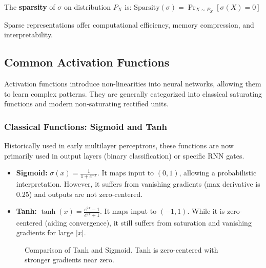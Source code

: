 \begin{definition}
The \textbf{sparsity} of $\sigma$ on distribution $P_X$ is:
$\text{Sparsity}(\sigma) = \Pr_{X \sim P_X}[\sigma(X) = 0]$
\end{definition}

Sparse representations offer computational efficiency, memory compression, and interpretability.

\subsection{Common Activation Functions}

Activation functions introduce non-linearities into neural networks, allowing them to learn complex patterns. They are generally categorized into classical saturating functions and modern non-saturating rectified units.

\subsubsection{Classical Functions: Sigmoid and Tanh}

Historically used in early multilayer perceptrons, these functions are now primarily used in output layers (binary classification) or specific RNN gates.

\begin{itemize}
    \item \textbf{Sigmoid:} $\sigma(x) = \frac{1}{1 + e^{-x}}$. It maps input to $(0, 1)$, allowing a probabilistic interpretation. However, it suffers from vanishing gradients (max derivative is 0.25) and outputs are not zero-centered.
    \item \textbf{Tanh:} $\tanh(x) = \frac{e^{2x} - 1}{e^{2x} + 1}$. It maps input to $(-1, 1)$. While it is zero-centered (aiding convergence), it still suffers from saturation and vanishing gradients for large $|x|$.
\end{itemize}

\begin{figure}[h]
    \centering
    \caption{Comparison of Tanh and Sigmoid. Tanh is zero-centered with stronger gradients near zero.}
    \label{fig:sigmoid_tanh}
\end{figure}

